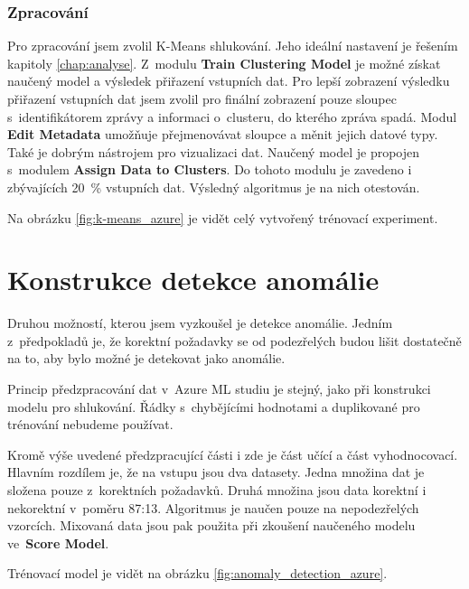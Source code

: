 \documentclass[thesis=M,czech]{FITthesis}[2012/10/20]
\begin{document}
		\subsubsection{Zpracování}
		Pro zpracování jsem zvolil K-Means shlukování. Jeho ideální nastavení je řešením kapitoly \ref{chap:analyse}. Z~modulu \textbf{Train Clustering Model} je možné získat naučený model a výsledek přiřazení vstupních dat. Pro lepší zobrazení výsledku přiřazení vstupních dat jsem zvolil pro finální zobrazení pouze sloupec s~identifikátorem zprávy a informaci o~clusteru, do kterého zpráva spadá. Modul \textbf{Edit Metadata} umožňuje přejmenovávat sloupce a měnit jejich datové typy. Také je dobrým nástrojem pro vizualizaci dat. Naučený model je propojen s~modulem \textbf{Assign Data to Clusters}. Do tohoto modulu je zavedeno i zbývajících 20~\% vstupních dat. Výsledný algoritmus je na nich otestován.
		
		Na obrázku \ref{fig:k-means_azure} je vidět celý vytvořený trénovací experiment.
	
	\section{Konstrukce detekce anomálie}
		\label{sec:construc_anomaly}
		Druhou možností, kterou jsem vyzkoušel je detekce anomálie. Jedním z~předpokladů je, že korektní požadavky se od podezřelých budou lišit dostatečně na to, aby bylo možné je detekovat jako anomálie.
		
		Princip předzpracování dat v~Azure ML studiu je stejný, jako při konstrukci modelu pro shlukování. Řádky s~chybějícími hodnotami a duplikované pro trénování nebudeme používat.
		
		Kromě výše uvedené předzpracující části i zde je část učící a část vyhodnocovací. Hlavním rozdílem je, že na vstupu jsou dva datasety. Jedna množina dat je složena pouze z~korektních požadavků. Druhá množina jsou data korektní i nekorektní v~poměru 87:13. Algoritmus je naučen pouze na nepodezřelých vzorcích. Mixovaná data jsou pak použita při zkoušení naučeného modelu ve~\textbf{Score Model}.
		
		Trénovací model je vidět na obrázku \ref{fig:anomaly_detection_azure}.
		
\end{document}
